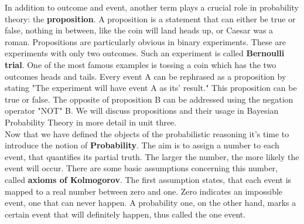\documentclass[12pt, a4paper]{scrartcl}
\begin{document}
In addition to outcome and event, another term plays a crucial role in probability theory: the \textbf{proposition}. A proposition is a statement that can either be true or false, nothing in between, like the coin will land heads up, or Caesar was a roman. Propositions are particularly obvious in binary experiments. These are experiments with only two outcomes. Such an experiment is called \textbf{Bernoulli trial}. One of the most famous examples is tossing a coin which has the two outcomes heads and tails. 
Every event A can be rephrased as a proposition by stating "The experiment will have event A as its’ result." This proposition can be true or false. The opposite of proposition B can be addressed using the negation operator "NOT" B. We will discuss propositions and their usage in Bayesian Probability Theory in more detail in unit three.
\\

Now that we have defined the objects of the probabilistic reasoning it’s time to introduce the notion of \textbf{Probability}. The aim is to assign a number to each event, that quantifies its partial truth. The larger the number, the more likely the event will occur. 
There are some basic assumptions concerning this number, called \textbf{axioms of Kolmogorov}. The first assumption states, that each event is mapped to a real number between zero and one. Zero indicates an impossible event, one that can never happen. A probability one, on the other hand, marks a certain event that will definitely happen, thus called the one event.\\

\\
\end{document}
